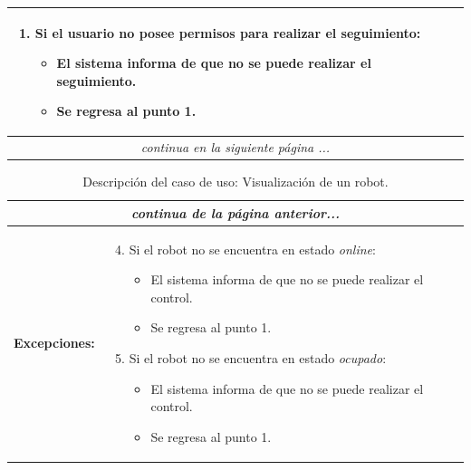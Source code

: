 \begin{table}[H]
\begin{center}
\begin{tabular}{|p{3.5cm}|p{10cm}|}
{\begin{enumerate}
	  \item Si el usuario no posee permisos para realizar el seguimiento:
	  \begin{itemize}
	      \item El sistema informa de que no se puede realizar el seguimiento.
	      \item Se regresa al punto 1.
	  \end{itemize}
	\end{enumerate}
	}\\
	\hline
     \multicolumn{2}{c}{\emph{continua en la siguiente página ...}}\\
    \end{tabular}
  \end{center}
\end{table}    


\begin{table}[H]
  \begin{center}
    \begin{tabular}{|p{3.5cm}|p{10cm}|}
     \multicolumn{2}{c}{\emph{continua de la página anterior...}}\\
     \hline
         {\textbf{Excepciones:}} & {
         \begin{enumerate}
           \setcounter{enumi}{3}
	  
	  \item Si el robot no se encuentra en estado \emph{online}:
	  \begin{itemize}
	    \item El sistema informa de que no se puede realizar el control.
	    \item Se regresa al punto 1.
	  \end{itemize}
  	  \item Si el robot no se encuentra en estado \emph{ocupado}:
	  \begin{itemize}
	    \item El sistema informa de que no se puede realizar el control.
	    \item Se regresa al punto 1.
	  \end{itemize}
	\end{enumerate}
	}\\
      \hline
    \end{tabular}
  \end{center}
\caption{Descripción del caso de uso: Visualización de un robot.}
\end{table}




